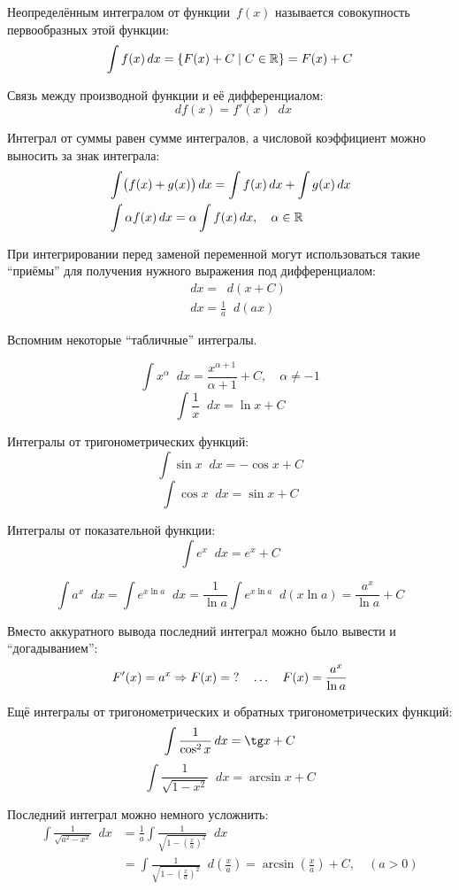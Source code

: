\documentclass[a4paper,12pt]{article}
\newcommand{\diff}{\mathop{}\!d}
\begin{document}
  Неопределённым интегралом от функции~$f(x)$ называется совокупность первообразных этой функции:
  \[
    \int f(x) \diff x = \{F(x) + C \mid C \in \RR\} = F(x) + C
  \]

  Связь между производной функции и её дифференциалом:
  \[
    \diff f(x) = f'(x) \diff x
  \]

  Интеграл от суммы равен сумме интегралов, а числовой коэффициент можно выносить за знак интеграла:
  \[
    \begin{aligned}
      &\int\bigl(f(x) + g(x)\bigr) \diff x = \int f(x) \diff x + \int g(x) \diff x\\
      &\int \alpha f(x) \diff x = \alpha \int f(x) \diff x,\quad \alpha \in \RR
    \end{aligned}
  \]

  При интегрировании перед заменой переменной могут использоваться такие ``приёмы'' для получения нужного выражения под дифференциалом:
  \[
    \begin{aligned}
      &\diff x = \diff (x + C)\\
      &\diff x = \frac{1}{a} \diff (ax)
    \end{aligned}
  \]

  Вспомним некоторые ``табличные'' интегралы.

  \[
    \int x^{\alpha} \diff x = \frac{x^{\alpha + 1}}{\alpha + 1} + C,\quad \alpha \not= -1
  \]
  \[
    \int \frac{1}{x} \diff x = \ln x + C
  \]

  Интегралы от тригонометрических функций:
  \[
    \int \sin x \diff x = -\cos x + C
  \]
  \[
    \int \cos x \diff x = \sin x + C
  \]

  Интегралы от показательной функции:
  \[
    \int e^x \diff x = e^x + C
  \]

  \[
    \int a^x \diff x = \int e^{x \ln a} \diff x = \frac{1}{\ln a} \int e^{x \ln a} \diff(x \ln a) = \frac{a^x}{\ln a} + C
  \]

  Вместо аккуратного вывода последний интеграл можно было вывести и ``догадыванием'':
  \[
      F'(x) = a^x \Rightarrow F(x) = \operatorname{?} \quad \ldots \quad F(x) = \frac{a^x}{\ln a}
  \]

  Ещё интегралы от тригонометрических и обратных тригонометрических функций:
  \[
    \int \frac{1}{\cos^2 x} \diff x = \tg x + C
  \]
  \[
    \int \frac{1}{\sqrt{1 - x^2}} \diff x = \arcsin x + C
  \]

  Последний интеграл можно немного усложнить:
  \begin{equation}\label{eq:int-to-arcsin}
  \begin{split}
    \int \frac{1}{\sqrt{a^2 - x^2}} \diff x
      &= \frac{1}{a} \int \frac{1}{\sqrt{1 - \left(\frac{x}{a}\right)^2}} \diff x\\
      &= \int \frac{1}{\sqrt{1 - \left(\frac{x}{a}\right)^2}} \diff \left(\frac{x}{a}\right)
      = \arcsin\left(\frac{x}{a}\right) + C,\quad (a > 0)
  \end{split}
  \end{equation}
\end{document}
